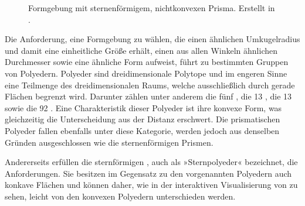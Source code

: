 \begin{figure}
	{\caption{Formgebung mit sternenförmigem, nichtkonvexen Prisma. Erstellt in .}\label{fig:formen:sterne3d-trans}}
\end{figure}

Die Anforderung, eine Formgebung zu wählen, die einen ähnlichen Umkugelradius und damit eine einheitliche Größe erhält, einen aus allen Winkeln ähnlichen Durchmesser sowie eine ähnliche Form aufweist, führt zu bestimmten Gruppen von Polyedern. Polyeder sind dreidimensionale Polytope und im engeren Sinne eine Teilmenge des dreidimensionalen Raums, welche ausschließlich durch gerade Flächen begrenzt wird. Darunter zählen unter anderem die fünf  \cite{RegularPolyhedra}, die 13 , die 13  sowie die 92  \cite{JohnsonPolyeder}. Eine Charakteristik dieser Polyeder ist ihre konvexe Form, was gleichzeitig die Unterscheidung aus der Distanz erschwert. Die prismatischen Polyeder fallen ebenfalls unter diese Kategorie, werden jedoch aus denselben Gründen ausgeschlossen wie die sternenförmigen Prismen.

Andererseits erfüllen die sternförmigen , auch als »Sternpolyeder« bezeichnet, die Anforderungen. Sie besitzen im Gegensatz zu den vorgenannten Polyedern auch konkave Flächen \cite{KeplerPoinsotSolid} und können daher, wie in der interaktiven Visualisierung von \cite{WebGLUniformPolyhedra} zu sehen, leicht von den konvexen Polyedern unterschieden werden.


